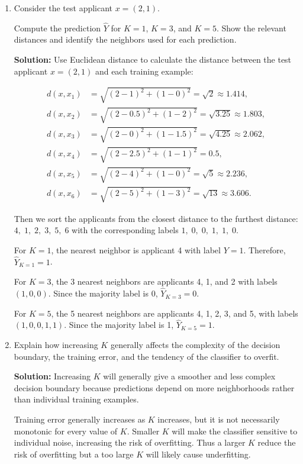 \documentclass{article}
\begin{document}
\begin{enumerate}

\item[(a)] Consider the test applicant $x=(2,1)$.

Compute the prediction $\hat{Y}$ for $K=1$, $K=3$, and $K=5$.
Show the relevant distances and identify the neighbors used
for each prediction.

\textbf{Solution:} Use Euclidean distance to calculate the distance between the test applicant $x=(2,1)$ and each training example:

\[
\begin{aligned}
d(x,x_1)
&=\sqrt{(2-1)^2+(1-0)^2}
=\sqrt{2}\approx1.414,\\
d(x,x_2)
&=\sqrt{(2-0.5)^2+(1-2)^2}
=\sqrt{3.25}\approx1.803,\\
d(x,x_3)
&=\sqrt{(2-0)^2+(1-1.5)^2}
=\sqrt{4.25}\approx2.062,\\
d(x,x_4)
&=\sqrt{(2-2.5)^2+(1-1)^2}
=0.5,\\
d(x,x_5)
&=\sqrt{(2-4)^2+(1-0)^2}
=\sqrt{5}\approx2.236,\\
d(x,x_6)
&=\sqrt{(2-5)^2+(1-3)^2}
=\sqrt{13}\approx3.606.
\end{aligned}
\]

Then we sort the applicants from the closest distance to the furthest distance: $4,\;1,\;2,\;3,\;5,\;6$ with the corresponding labels $1,\;0,\;0,\;1,\;1,\;0$.

For $K=1$, the nearest neighbor is applicant 4 with label $Y=1$. Therefore,
$\hat{Y}_{K=1}=1$.

For $K=3$, the 3 nearest neighbors are applicants 4, 1, and 2 with labels $(1,0,0)$. Since the majority label is 0, $\hat{Y}_{K=3}=0$.

For $K=5$, the 5 nearest neighbors are applicants 4, 1,
2, 3, and 5, with labels $(1,0,0,1,1)$. Since the majority label is 1, $\hat{Y}_{K=5}=1$.


\item[(b)] Explain how increasing $K$ generally affects
the complexity of the decision boundary, the training error,
and the tendency of the classifier to overfit.

\textbf{Solution:} Increasing $K$ will generally give a smoother and
less complex decision boundary because predictions depend on more neighborhoods rather than individual training examples.

Training error generally increases as $K$ increases, but it is not necessarily monotonic for every value of $K$. Smaller $K$ will make the classifier sensitive to individual noise, increasing the risk of overfitting. Thus a larger $K$ reduce the risk of overfitting but a too large $K$ will likely cause underfitting.


\end{enumerate}
\end{document}
